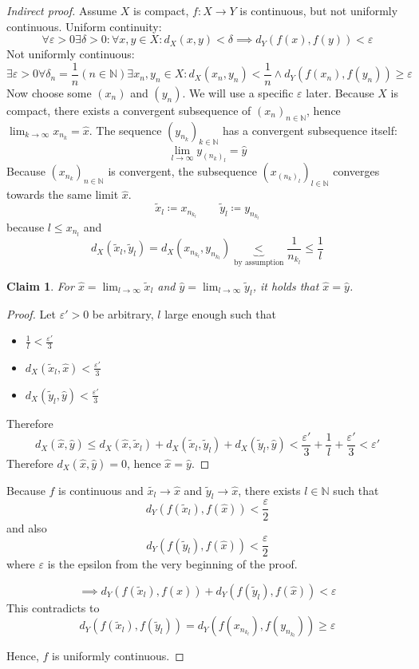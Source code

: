\documentclass{article}
\newtheorem*{claim}{Claim}%
\begin{document}
\begin{proof}[Indirect proof]
  Assume $X$ is compact, $f: X \to Y$ is continuous, but not uniformly continuous. Uniform continuity:
  \[ \forall \varepsilon > 0 \exists \delta > 0: \forall x, y \in X: d_X(x,y) < \delta \implies d_Y(f(x), f(y)) < \varepsilon \]
  Not uniformly continuous:
  \[ \exists \varepsilon > 0 \forall \delta_n = \frac1n (n \in \mathbb N) \exists x_n, y_n \in X: d_X(x_n, y_n) < \frac1n \land d_Y(f(x_n), f(y_n)) \geq \varepsilon \]
  Now choose some $(x_n)$ and $(y_n)$. We will use a specific $\varepsilon$ later.
  Because $X$ is compact, there exists a convergent subsequence of $(x_n)_{n \in \mathbb N}$, hence $\lim_{k\to\infty} x_{n_k} = \hat{x}$.
  The sequence $(y_{n_k})_{k \in \mathbb N}$ has a convergent subsequence itself:
  \[ \lim_{l\to\infty} y_{(n_k)_l} = \hat{y} \]
  Because $(x_{n_k})_{n \in \mathbb N}$ is convergent, the subsequence $(x_{(n_k)_l})_{l \in \mathbb N}$ converges towards the same limit $\hat{x}$.
  \[ \tilde{x}_l \coloneqq x_{n_{k_l}} \qquad \tilde{y}_l \coloneqq y_{n_{k_l}} \]
  because $l \leq x_{n_l}$ and
  \[ d_X(\tilde{x}_l, \tilde{y}_l) = d_X(x_{n_{k_l}}, y_{n_{k_l}}) \underbrace{<}_{\text{by assumption}} \frac{1}{n_{k_l}} \leq \frac1l \]

  \begin{claim}
    For $\hat{x} = \lim_{l\to\infty} \tilde{x}_l$ and $\hat{y} = \lim_{l\to\infty} \tilde{y}_l$, it holds that $\hat{x} = \hat{y}$.
  \end{claim}
  \begin{proof}
    Let $\varepsilon' > 0$ be arbitrary, $l$ large enough such that
    \begin{itemize}
      \item $\frac1l < \frac{\varepsilon'}{3}$
      \item $d_X(\tilde{x}_l, \hat{x}) < \frac{\varepsilon'}{3}$
      \item $d_X(\tilde{y}_l, \hat{y}) < \frac{\varepsilon'}{3}$
    \end{itemize}
    Therefore
    \[
      d_X(\hat x, \hat y) \leq d_X(\hat x, \tilde x_l) + d_X(\tilde x_l, \tilde y_l) + d_X(\tilde y_l, \hat y)
      < \frac{\varepsilon'}{3} + \frac1l + \frac{\varepsilon'}{3} < \varepsilon'
    \]
    Therefore $d_X(\hat{x}, \hat{y}) = 0$, hence $\hat{x} = \hat{y}$.
  \end{proof}
  Because $f$ is continuous and $\tilde{x_l} \to \hat{x}$ and $\tilde{y}_l \to \hat{x}$, there exists $l \in \mathbb N$ such that
  \[ d_Y(f(\tilde x_l), f(\hat{x})) < \frac\varepsilon2 \]
  and also
  \[ d_Y(f(\tilde y_l), f(\hat{x})) < \frac\varepsilon2 \]
  where $\varepsilon$ is the epsilon from the very beginning of the proof.

  \[ \implies d_Y(f(\tilde x_l), f(\hat{x})) + d_Y(f(\tilde y_l), f(\hat{x})) < \varepsilon \]
  This contradicts to
  \[ d_Y(f(\tilde{x}_l), f(\tilde{y}_l)) = d_Y(f(x_{n_{k_l}}), f(y_{n_{k_l}})) \geq \varepsilon \]

  Hence, $f$ is uniformly continuous.
\end{proof}
\end{document}
